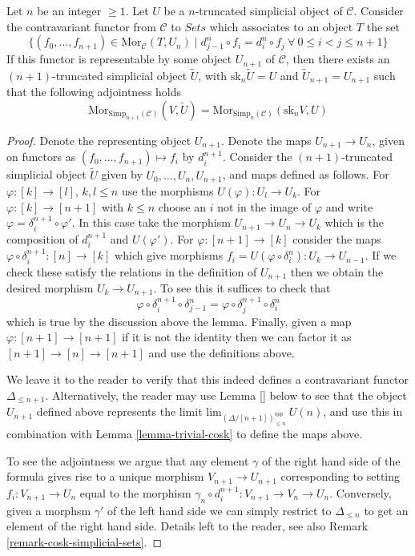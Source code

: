 \begin{lemma}
\label{lemma-work-out}
Let $n$ be an integer $\geq 1$. Let $U$ be a $n$-truncated
simplicial object of $\mathcal{C}$. Consider the
contravariant functor from $\mathcal{C}$ to $\textit{Sets}$
which associates to an object $T$ the set
$$
\{ (f_0,\ldots,f_{n + 1}) \in \text{Mor}_{\mathcal{C}}(T, U_n)
\mid
d^n_{j - 1} \circ f_i = d^n_i \circ f_j\ 
\forall\ 0\leq i < j\leq n + 1\}
$$
If this functor is representable by some object $U_{n + 1}$
of $\mathcal{C}$, then there exists an $(n + 1)$-truncated
simplicial object $\tilde U$, with $\text{sk}_n \tilde U = U$
and $\tilde U_{n + 1} = U_{n + 1}$ such that the following
adjointness holds
$$
\text{Mor}_{\text{Simp}_{n + 1}(\mathcal{C})}(V, \tilde U)
=
\text{Mor}_{\text{Simp}_n(\mathcal{C})}(\text{sk}_nV, U)
$$
\end{lemma}

\begin{proof}
Denote the representing object $U_{n + 1}$. Denote the maps
$U_{n + 1} \to U_n$, given on functors as
$(f_0,\ldots,f_{n + 1}) \mapsto f_i$ by
$d^{n + 1}_i$. Consider the $(n + 1)$-truncated
simplicial object $\tilde U$ given by $U_0, \ldots, U_n, U_{n + 1}$, and
maps defined as follows. For $\varphi : [k] \to [l]$, $k,l \leq n$
use the morphisms $U(\varphi) : U_l \to U_k$.
For $\varphi : [k] \to [n + 1]$ with $k \leq n$ choose
an $i$ not in the image of $\varphi$ and write
$\varphi = \delta^{n + 1}_i \circ \varphi'$. In this case take
the morphism $U_{n + 1} \to U_n \to U_k$ which is
the composition of $d^{n + 1}_i$ and $U(\varphi')$.
For $\varphi : [n + 1] \to [k]$ consider the maps
$\varphi \circ \delta^{n + 1}_i : [n] \to [k]$ which
give morphisms $f_i = U(\varphi \circ \delta^n_i) : U_k \to U_{n - 1}$.
If we check these satisfy the relations in the definition
of $U_{n + 1}$ then we obtain the desired morphism $U_k \to U_{n + 1}$.
To see this it suffices to check that
$$
\varphi \circ \delta^{n + 1}_i \circ \delta^n_{j - 1}
=
\varphi \circ \delta^{n + 1}_j \circ \delta^n_i
$$
which is true by the discussion above the lemma.
Finally, given a map $\varphi : [n + 1] \to [n + 1]$
if it is not the identity then we can factor it
as $[n + 1] \to [n] \to [n + 1]$ and use the definitions
above.

\medskip\noindent
We leave it to the reader to verify that this indeed
defines a contravariant functor $\Delta_{\leq n + 1}$.
Alternatively, the reader may use Lemma \ref{} below
to see that the object $U_{n + 1}$ defined above represents
the limit $\text{lim}_{(\Delta/[n + 1])_{\leq n}^{opp}}\ U(n)$,
and use this in combination with Lemma \ref{lemma-trivial-cosk}
to define the maps above.

\medskip\noindent
To see the adjointness we argue that any element
$\gamma$ of the right hand side of the formula
gives rise to a unique morphism $V_{n + 1} \to U_{n + 1}$
corresponding to setting $f_i : V_{n+1} \to U_n$
equal to the morphism $\gamma_n \circ d^{n+1}_i : V_{n+1} \to V_n \to U_n$.
Conversely, given a morphsm $\gamma'$ of the left hand side
we can simply restrict to $\Delta_{\leq n}$ to get an element
of the right hand side.
Details left to the reader, see also
Remark \ref{remark-cosk-simplicial-sets}.
\end{proof}

